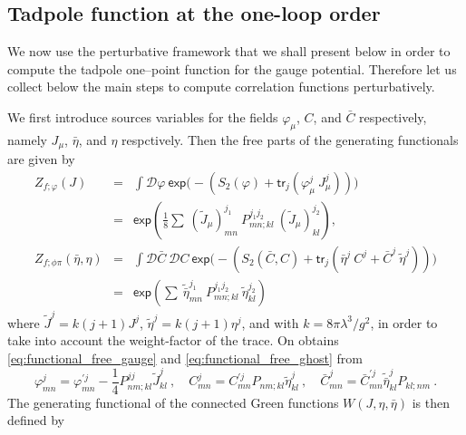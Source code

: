 \documentclass[11pt]{book}
\newcommand{\tr}{\mathsf{tr}}
\renewcommand{\exp}{\mathsf{exp}}
\newcommand{\Dcal}{\mathcal{D}}
\theoremstyle{break}
\begin{document}
\subsection*{Tadpole function at the one-loop order}


We now use the perturbative framework that we shall present below in order to compute the tadpole one--point function for the gauge potential. Therefore let us collect below the main steps to compute correlation functions perturbatively.

We first introduce sources variables for the fields $\varphi_\mu$, $C$, and $\bar{C}$ respectively, namely $J_\mu$, $\bar{\eta}$, and $\eta$ respctively. Then the free parts of the generating functionals are given by
%
\begin{eqnarray}
Z_{f;\varphi}(J) 
&=& \int \Dcal \varphi \ \exp\bigg( - \left( S_2(\varphi) + \tr_j\left(\varphi_\mu^j \ J^j_\mu \right) \right) \bigg) \nonumber \\
&=& \exp\left( \frac18 \sum \ (\widetilde{J}_\mu)^{j_1}_{mn} \ P^{j_1 j_2}_{mn;kl} \ (\widetilde{J}_\mu)^{j_2}_{kl} \right) \label{eq:functional_free_gauge}, \\
%
Z_{f;\phi\pi}(\bar \eta,\eta) 
&=& \int \Dcal \bar{C} \ \Dcal C \ \exp\bigg( - \left( S_2(\bar{C},C) + \tr_j\left(\bar{\eta}^j \ C^j + \bar{C}^j \ \widetilde{\eta}^j \right) \right) \bigg) \nonumber\\
&=& \exp\left( \sum \ \widetilde{\bar\eta}^{j_1}_{mn} \ P^{j_1 j_2}_{mn;kl} \ \widetilde{\eta}^{j_2}_{kl} \right)
\label{eq:functional_free_ghost}
\end{eqnarray}
%
where $\widetilde J^j = k (j+1) J^j$, $\widetilde{\eta}^j = k (j+1) \eta^j$, and with $k=8\pi\lambda^3/g^2$, in order to take into account the weight-factor of the trace. On obtains \eqref{eq:functional_free_gauge} and \eqref{eq:functional_free_ghost} from
%
\begin{equation*}
\varphi^j_{mn} = \varphi^{\prime j}_{mn} - \frac14 P^{jj}_{nm;kl} \widetilde J^j_{kl} \ , \quad
C^j_{mn} = C^{\prime j}_{mn} P_{nm;kl} \widetilde\eta^j_{kl} \ , \quad  
\bar{C}^j_{mn} = \bar{C}^{\prime j}_{mn} \widetilde{\bar\eta}^j_{kl} P_{kl;nm} \ .
\end{equation*}
%
The generating functional of the connected Green functions $W(J,\eta,\bar\eta)$ is then defined by
\end{document}
